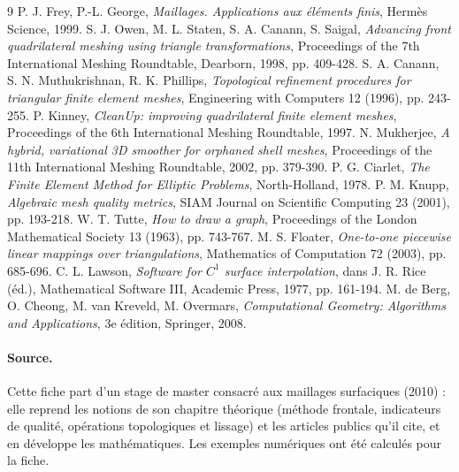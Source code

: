 \documentclass[11pt,a4paper]{article}
\theoremstyle{plain}
\theoremstyle{definition}
\theoremstyle{remark}
\begin{document}
\begin{thebibliography}{9}
 P. J. Frey, P.-L. George, \emph{Maillages. Applications aux éléments finis}, Hermès Science, 1999.
 S. J. Owen, M. L. Staten, S. A. Canann, S. Saigal, \emph{Advancing front quadrilateral meshing using triangle transformations}, Proceedings of the 7th International Meshing Roundtable, Dearborn, 1998, pp. 409-428.
 S. A. Canann, S. N. Muthukrishnan, R. K. Phillips, \emph{Topological refinement procedures for triangular finite element meshes}, Engineering with Computers 12 (1996), pp. 243-255.
 P. Kinney, \emph{CleanUp: improving quadrilateral finite element meshes}, Proceedings of the 6th International Meshing Roundtable, 1997.
 N. Mukherjee, \emph{A hybrid, variational 3D smoother for orphaned shell meshes}, Proceedings of the 11th International Meshing Roundtable, 2002, pp. 379-390.
 P. G. Ciarlet, \emph{The Finite Element Method for Elliptic Problems}, North-Holland, 1978.
 P. M. Knupp, \emph{Algebraic mesh quality metrics}, SIAM Journal on Scientific Computing 23 (2001), pp. 193-218.
 W. T. Tutte, \emph{How to draw a graph}, Proceedings of the London Mathematical Society 13 (1963), pp. 743-767.
 M. S. Floater, \emph{One-to-one piecewise linear mappings over triangulations}, Mathematics of Computation 72 (2003), pp. 685-696.
 C. L. Lawson, \emph{Software for $C^1$ surface interpolation}, dans J. R. Rice (éd.), Mathematical Software III, Academic Press, 1977, pp. 161-194.
 M. de Berg, O. Cheong, M. van Kreveld, M. Overmars, \emph{Computational Geometry: Algorithms and Applications}, 3e édition, Springer, 2008.
\end{thebibliography}

\paragraph{Source.} Cette fiche part d'un stage de master consacré aux maillages surfaciques (2010) : elle reprend les notions de son chapitre théorique (méthode frontale, indicateurs de qualité, opérations topologiques et lissage) et les articles publics qu'il cite, et en développe les mathématiques. Les exemples numériques ont été calculés pour la fiche.
\end{document}
